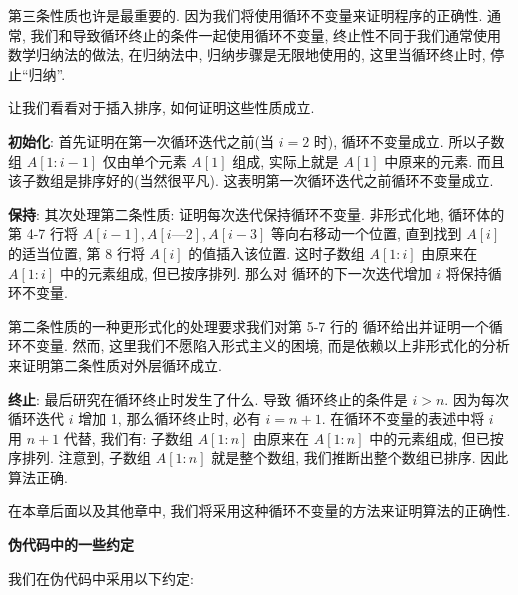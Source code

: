 \documentclass[oneside,10pt,fontset=none]{ctexbook}
\begin{document}
第三条性质也许是最重要的. 因为我们将使用循环不变量来证明程序的正确性. 通常, 我们和导致循环终止的条件一起使用循环不变量, 终止性不同于我们通常使用数学归纳法的做法, 在归纳法中, 归纳步骤是无限地使用的, 这里当循环终止时, 停止``归纳''.

让我们看看对于插入排序, 如何证明这些性质成立.

\textbf{初始化}: 首先证明在第一次循环迭代之前(当 $i=2$ 时), 循环不变量成立. 所以子数组 $A[1:i-1]$ 仅由单个元素 $A[1]$ 组成, 实际上就是 $A[1]$ 中原来的元素. 而且该子数组是排序好的(当然很平凡). 这表明第一次循环迭代之前循环不变量成立.

\textbf{保持}: 其次处理第二条性质: 证明每次迭代保持循环不变量. 非形式化地,  循环体的第 4-7 行将 $A[i-1], A[i—2], A[i-3]$ 等向右移动一个位置, 直到找到 $A[i]$ 的适当位置, 第 8 行将 $A[i]$ 的值插入该位置. 这时子数组 $A[1:i]$ 由原来在 $A[1:i]$ 中的元素组成, 但已按序排列. 那么对  循环的下一次迭代增加 $i$ 将保持循环不变量.

第二条性质的一种更形式化的处理要求我们对第 5-7 行的  循环给出并证明一个循环不变量. 然而, 这里我们不愿陷入形式主义的困境, 而是依赖以上非形式化的分析来证明第二条性质对外层循环成立.

\textbf{终止}: 最后研究在循环终止时发生了什么. 导致  循环终止的条件是 $i > n$. 因为每次循环迭代 $i$ 增加 1, 那么循环终止时, 必有 $i=n+1$. 在循环不变量的表述中将 $i$ 用 $n+1$ 代替, 我们有: 子数组 $A[1:n]$ 由原来在 $A[1:n]$ 中的元素组成, 但已按序排列. 注意到, 子数组 $A[1:n]$ 就是整个数组, 我们推断出整个数组已排序. 因此算法正确.

在本章后面以及其他章中, 我们将采用这种循环不变量的方法来证明算法的正确性.

\textbf{伪代码中的一些约定}

我们在伪代码中采用以下约定:
\end{document}
